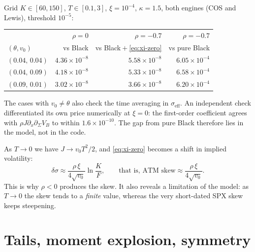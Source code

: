 \begin{progetto}[title={\texorpdfstring{In the qpricer project: the limit $\xi\to0$ measured}{In the qpricer project: the limit xi -> 0 measured}}]
Grid $K\in[60,150]$, $T\in[0.1,3]$, $\xi=10^{-4}$, $\kappa=1.5$, both engines (COS and Lewis), threshold $10^{-5}$:
\begin{center}
\small
\begin{tabular}{@{}lrrr@{}}
\toprule
 & $\rho=0$ & $\rho=-0.7$ & $\rho=-0.7$\\
$(\theta,v_0)$ & vs Black & vs Black${}+{}$\eqref{eq:xi-zero} & vs pure Black\\
\midrule
$(0.04,\,0.04)$ & ${4.36\times10^{-8}}$ & ${5.58\times10^{-8}}$ & ${6.05\times10^{-4}}$\\
$(0.04,\,0.09)$ & ${4.18\times10^{-8}}$ & ${5.33\times10^{-8}}$ & ${6.58\times10^{-4}}$\\
$(0.09,\,0.01)$ & ${3.02\times10^{-8}}$ & ${3.66\times10^{-8}}$ & ${6.20\times10^{-4}}$\\
\bottomrule
\end{tabular}
\end{center}
The cases with $v_0\ne\theta$ also check the time averaging in $\sigma_{\text{eff}}$. An independent check
differentiated its own price numerically at $\xi=0$: the first-order coefficient agrees with $\rho J\partial_x
\partial_\Sigma V_B$ to within ${1.6\times10^{-10}}$. The gap from pure Black therefore lies in the model, not in the
code.
\end{progetto}

As $T\to0$ we have $J\to v_0T^2/2$, and \eqref{eq:xi-zero} becomes a shift in implied volatility:
\begin{equation}\label{eq:heston-skew}
\delta\sigma\approx\frac{\rho\,\xi}{4\sqrt{v_0}}\ln\frac KF,
\qquad\text{that is, ATM skew}\approx\frac{\rho\,\xi}{4\sqrt{v_0}} .
\end{equation}
This is why $\rho<0$ produces the skew. It also reveals a limitation of the model: as $T\to0$ the skew tends to a
\emph{finite} value, whereas the very short-dated SPX skew keeps steepening.

\section{Tails, moment explosion, symmetry}
\label{sec:heston-code}
